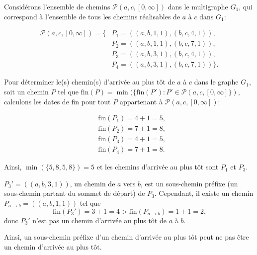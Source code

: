 \begin{reponse}
  Considérons l'ensemble de chemins $\mathcal{P}(a,c,[0, \infty])$ dans le
  multigraphe $G_{1}$, qui correspond à l'ensemble de tous les chemins
  réalisables de $a$ à $c$ dans $G_{1}$:


  \begin{equation}
  \begin{align}
    \mathcal{P}(a,c,[0, \infty]) = \{ & P_1 = ((a,b,1,1), (b,c,4,1)), \\
                                      & P_2 = ((a,b,1,1), (b,c,7,1)), \\
                                      & P_3 = ((a,b,3,1), (b,c,4,1)), \\
                                      & P_4 = ((a,b,3,1), (b,c,7,1)) \}.
  \end{align}\label{eq:1}
\end{equation}



  Pour déterminer le(s) chemin(s) d'arrivée au plus tôt de $a$ à $c$ dans le
  graphe $G_{1}$, soit un chemin $P$ tel que
  $\mathrm{fin}(P) = \min(\{\mathrm{fin}(P'): P' \in \mathcal{P}(a,c,[0,
  \infty]\})$, calculons les dates de fin pour tout
  $P$ appartenant à $\mathcal{P}(a,c,[0, \infty])$:

  \begin{equation}
  \begin{align}
    & \mathrm{fin}(P_1) = 4 + 1 = 5, \\
    & \mathrm{fin}(P_2) = 7 + 1 = 8, \\
    & \mathrm{fin}(P_3) = 4 + 1 = 5, \\
    & \mathrm{fin}(P_4) = 7 + 1 = 8.
  \end{align}
  \label{eq:2}
\end{equation}


  Ainsi, $\min(\{5,8,5,8\}) = 5$ et les chemins d'arrivée au plus tôt sont $P_1$
  et $P_3$.

  $P_{3}' = ((a,b,3,1))$, un chemin de $a$ vers $b$, est un sous-chemin préfixe
  (un sous-chemin partant du sommet de départ) de $P_{3}$. Cependant, il existe
  un chemin $P_{a \rightarrow b} = ((a,b,1,1))$ tel que
  \begin{equation}
    \mathrm{fin}(P_{3}') = 3 + 1 = 4 > \mathrm{fin}(P_{a \rightarrow b}) = 1 + 1
    = 2 \text{,}
    \label{eq:4}
  \end{equation}
  donc $P_{3}'$ n'est pas un chemin d'arrivée au plus tôt de $a$ à $b$.

  Ainsi, un sous-chemin préfixe d'un chemin d'arrivée au plus tôt peut ne pas
  être un chemin d'arrivée au plus tôt.
\end{reponse}


